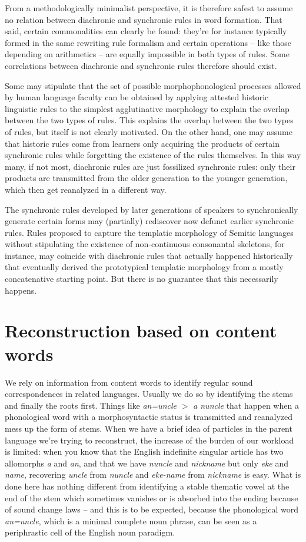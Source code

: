 \documentclass[a4paper, oneside, scheme=plain, 12pt]{article}
\newcommand{\form}[1]{\emph{#1}}
\newcommand*{\textgt}{$>$ }
\begin{document}
From a methodologically minimalist perspective,
it is therefore safest to assume no relation between diachronic and synchronic rules in word formation.
That said, certain commonalities can clearly be found:
they're for instance typically formed in the same rewriting rule formalism
and certain operations -- like those depending on arithmetics -- 
are equally impossible in both types of rules.
Some correlations between diachronic and synchronic rules therefore should exist.

Some may stipulate that the set of possible morphophonological processes allowed by human language faculty
can be obtained by applying attested historic linguistic rules to the simplest agglutinative morphology
to explain the overlap between the two types of rules.
This explains the overlap between the two types of rules,
but itself is not clearly motivated.
On the other hand, one may assume that historic rules come from learners only acquiring the products of certain synchronic rules while forgetting the existence of the rules themselves.
In this way many, if not most, diachronic rules are just fossilized synchronic rules:
only their products are transmitted from the older generation to the younger generation,
which then get reanalyzed in a different way.

The synchronic rules developed by later generations of speakers to synchronically generate certain forms
may (partially) rediscover now defunct earlier synchronic rules. 
Rules proposed to capture the templatic morphology of Semitic languages 
without stipulating the existence of non-continuous consonantal skeletons,
for instance, may coincide with diachronic rules that actually happened historically that 
eventually derived the prototypical templatic morphology from a mostly concatenative starting point.
But there is no guarantee that this necessarily happens.


\section{Reconstruction based on content words}

We rely on information from content words to identify regular sound correspondences in related languages.
Usually we do so by identifying the stems and finally the roots first.
Things like \form{an=uncle} \textgt \form{a nuncle} that happen
when a phonological word with a morphosyntactic status is transmitted and reanalyzed mess up the form of stems.
When we have a brief idea of particles in the parent language we're trying to reconstruct,
the increase of the burden of our workload is limited:
when you know that the English indefinite singular article has two allomorphs \form{a} and \form{an},
and that we have \form{nuncle} and \form{nickname} but only \form{eke} and \form{name},
recovering \form{uncle} from \form{nuncle} and \form{eke-name} from \form{nickname} is easy.
What is done here has nothing different from identifying a stable thematic vowel
at the end of the stem which sometimes vanishes or is absorbed into the ending because of sound change laws
-- and this is to be expected, because
the phonological word \form{an=uncle}, which is a minimal complete noun phrase,
can be seen as a periphrastic cell of the English noun paradigm.
\end{document}
